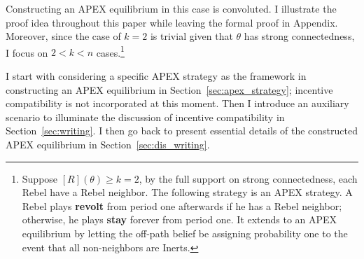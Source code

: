 \documentclass[12pt,letter]{article}
\theoremstyle{definition}
\theoremstyle{remark}
\theoremstyle{claim}
\begin{document}
Constructing an APEX equilibrium in this case is convoluted. I illustrate the proof idea throughout this paper while leaving the formal proof in Appendix. Moreover, since the case of $k=2$ is trivial given that $\theta$ has strong connectedness, I focus on $2<k<n$ cases.\footnote{Suppose $[R](\theta)\geq k=2$, by the full support on strong connectedness, each Rebel have a Rebel neighbor. The following strategy is an APEX strategy. A Rebel plays \textbf{revolt} from period one afterwards if he has a Rebel neighbor; otherwise, he plays \textbf{stay} forever from period one. It extends to an APEX equilibrium by letting the off-path belief be assigning probability one to the event that all non-neighbors are Inerts.} 

I start with considering a specific APEX strategy as the framework in constructing an APEX equilibrium in Section~\ref{sec:apex_strategy}; incentive compatibility is not incorporated at this moment. Then I introduce an auxiliary scenario to illuminate the discussion of incentive compatibility in Section~\ref{sec:writing}. I then go back to present essential details of the constructed APEX equilibrium in Section~\ref{sec:dis_writing}. 
\end{document}
